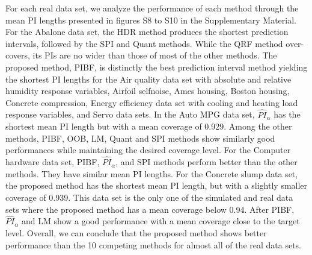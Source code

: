 For each real data set, we analyze the performance of each method through the mean PI lengths presented in figures S8 to S10 in the Supplementary Material. For the Abalone data set, the HDR method produces the shortest prediction intervals, followed by the SPI and Quant methods. While the QRF method over-covers, its PIs are no wider than those of most of the other methods. The proposed method, PIBF, is distinctly the best prediction interval method yielding the shortest PI lengths for the Air quality data set with absolute and relative humidity response variables, Airfoil selfnoise, Ames housing, Boston housing, Concrete compression, Energy efficiency data set with cooling and heating load response variables, and Servo data sets. In the Auto MPG data set, $\widehat{PI}_\alpha$ has the shortest mean PI length but with a mean coverage of 0.929. Among the other methods, PIBF, OOB, LM, Quant and SPI methods show similarly good performances while maintaining the desired coverage level. For the Computer hardware data set, PIBF, $\widehat{PI}_\alpha$, and SPI methods perform better than the other methods. They have similar mean PI lengths. For the Concrete slump data set, the proposed method has the shortest mean PI length, but with a slightly smaller coverage of 0.939. This data set is the only one of the simulated and real data sets where the proposed method has a mean coverage below 0.94. After PIBF, $\widehat{PI}_\alpha$ and LM show a good performance with a mean coverage close to the target level. Overall, we can conclude that the proposed method shows better performance than the 10 competing methods for almost all of the real data sets.

